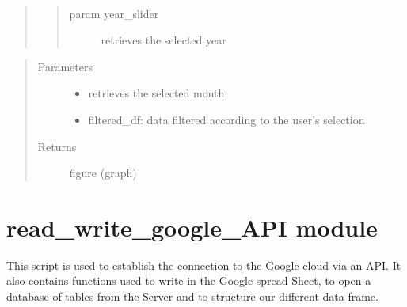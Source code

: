 \documentclass[letterpaper,10pt,english]{sphinxmanual}
\begin{document}
\begin{fulllineitems}
\label{\detokenize{update_figure:update_figure_motors_general}}~\begin{quote}
\begin{quote}\begin{description}
\item[{param year\_slider}] \leavevmode
\sphinxAtStartPar
retrieves the selected year

\end{description}\end{quote}
\end{quote}
\begin{quote}\begin{description}
\item[{Parameters}] \leavevmode\begin{itemize}
\item {} 
\sphinxAtStartPar
{} \textendash{} retrieves the selected month

\item {} 
\sphinxAtStartPar
{} \textendash{} filtered\_df: data filtered according to the user’s selection

\end{itemize}

\item[{Returns}] \leavevmode
\sphinxAtStartPar
figure (graph)

\end{description}\end{quote}

\end{fulllineitems}



\section{read\_write\_google\_API module}
\label{\detokenize{read_write_google_API:read-write-google-api-module}}\label{\detokenize{read_write_google_API::doc}}
\sphinxAtStartPar
This script is used to establish the connection to the Google cloud via an API. It also contains functions used to write in the Google spread Sheet, to open a database of tables from the Server and to structure our different data frame.
\end{document}

